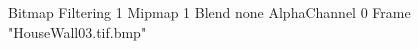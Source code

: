 {Bitmap
	{Filtering 1}
	{Mipmap 1}
	{Blend none}
	{AlphaChannel 0}
	{Frame "HouseWall03.tif.bmp"}
}
